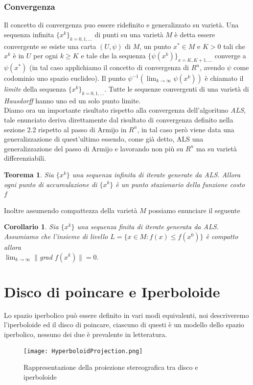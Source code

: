 \documentclass[a4paper, 12pt]{article}
\newtheorem{theorem}{Teorema}
\newtheorem{corollary}{Corollario}
\begin{document}
\subsubsection{Convergenza}
Il concetto di convergenza puo essere ridefinito e generalizzato su varietà. Una sequenza infinita $\{x^k\}_{k=0,1,...}$ di punti su una varietà $M$ è detta essere convergente se esiste una carta $(U, \psi)$ di $M$, un punto $x^\ast \in M$ e $K > 0$ tali che $x^k$ è in $U$ per ogni $k \geq K$ e tale che la sequenza $\{\psi(x^k)\}_{x=K, K+1, ...}$ converge a $\psi(x^\ast)$ (in tal caso applichiamo il concetto di convergenza di $R^n$, avendo $\psi$ come codominio uno spazio euclideo). Il punto $\psi^{-1}(\lim_{k \to \infty} \psi(x^k))$ è chiamato il \emph{limite} della sequenza $\{x^k\}_{k=0,1,...}$. Tutte le sequenze convergenti di una varietà di \emph{Hausdorff} hanno uno ed un solo punto limite.\\
Diamo ora un importante risultato rispetto alla convergenza dell'algoritmo \emph{ALS}, tale enunciato deriva direttamente dal risultato di convergenza definito nella sezione 2.2 rispetto al passo di Armijo in $R^n$, in tal caso però viene data una generalizzazione di quest'ultimo essendo, come già detto, ALS una generalizzazione del passo di Armijo e lavorando non più su $R^n$ ma su varietà differenziabili.
\begin{theorem}
Sia $\{x^k\}$ una sequenza infinita di iterate generate da ALS. Allora ogni punto di accumulazione  di $\{x^k\}$ è un punto stazionario della funzione costo $f$
\end{theorem}
Inoltre assumendo compattezza della varietà $M$ possiamo enunciare il seguente
\begin{corollary}
Sia $\{x^k\}$ una sequenza finita di iterate generata da ALS. Assumiamo che l'insieme di livello $L = \{x \in M : f(x) \leq f(x^0)\}$ è compatto allora\\ $\lim_{k \to \infty} \parallel $grad $f(x^k) \parallel = 0$.
\end{corollary}

\section{Disco di poincare e Iperboloide}
Lo spazio iperbolico può essere definito in vari modi equivalenti, noi descriveremo l'iperboloide ed il disco di poincare, ciascuno di questi è un modello dello spazio iperbolico, nessuno dei due è prevalente in letteratura.\\
\begin{figure}[t] %
    \centering\texttt{[image: HyperboloidProjection.png]}
    \caption{Rappresentazione della proiezione stereografica tra disco e iperboloide}
\end{figure}
\end{document}
